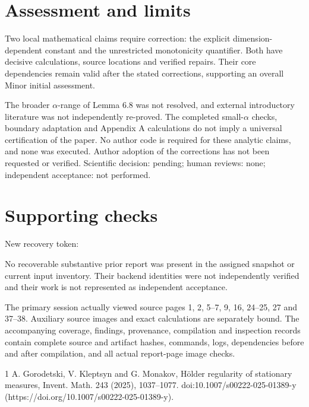 \documentclass[10pt]{article}
\begin{document}
\section*{Assessment and limits}
Two local mathematical claims require correction: the explicit dimension-dependent constant and the unrestricted monotonicity quantifier. Both have decisive calculations, source locations and verified repairs. Their core dependencies remain valid after the stated corrections, supporting an overall Minor initial assessment.\par
The broader \(\alpha\)-range of Lemma 6.8 was not resolved, and external introductory literature was not independently re-proved. The completed small-\(\alpha\) checks, boundary adaptation and Appendix A calculations do not imply a universal certification of the paper. No author code is required for these analytic claims, and none was executed. Author adoption of the corrections has not been requested or verified. Scientific decision: pending; human reviews: none; independent acceptance: not performed.\par
\section*{Supporting checks}
New recovery token:\par
No recoverable substantive prior report was present in the assigned snapshot or current input inventory. Their backend identities were not independently verified and their work is not represented as independent acceptance.\par
The primary session actually viewed source pages 1, 2, 5–7, 9, 16, 24–25, 27 and 37–38. Auxiliary source images and exact calculations are separately bound. The accompanying coverage, findings, provenance, compilation and inspection records contain complete source and artifact hashes, commands, logs, dependencies before and after compilation, and all actual report-page image checks.\par
1 A. Gorodetski, V. Kleptsyn and G. Monakov, Hölder regularity of stationary measures, Invent. Math. 243 (2025), 1037–1077. doi:10.1007/s00222-025-01389-y (https://doi.org/10.1007/s00222-025-01389-y).\par
\end{document}
